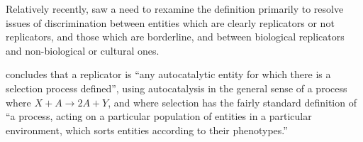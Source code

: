 %
%

Relatively recently, \textcite{Zachar2010} saw a need to rexamine the definition primarily to resolve issues of discrimination between entities which are clearly replicators or not replicators, and those which are borderline, and between biological replicators and non-biological or cultural ones. 


\Textcite{Zachar2010} concludes that a replicator is ``any autocatalytic entity for which there is a selection process defined'', using autocatalysis in the general sense of a process where $X + A\rightarrow 2A + Y$, and where selection has the fairly standard definition of ``a process, acting on a particular population of entities in a particular environment, which sorts entities according to their phenotypes.'' \parencite[p.21]{Zachar2010}


